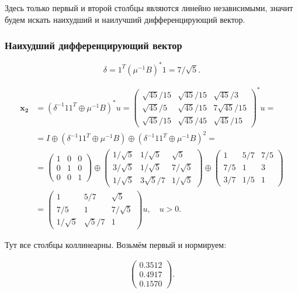 \documentclass[specialist,
  substylefile = spbu.rtx,
  href,
  colorlinks=true,
  12pt]{disser}
\begin{document}
	Здесь только первый и второй столбцы являются линейно независимыми, значит будем искать наихудший и наилучший дифференцирующий вектор.
	
	\subsubsection{Наихудший дифференцирующий вектор}
	\label{sec:org44470ad}
	\[
	\delta = 1^T(\mu^{-1}B)^*1 = 7/\sqrt{5}.
	\]
	
	\begin{align*}
		\boldsymbol{x_2} &= (\delta^{-1}11^T \oplus \mu^{-1}B)^*u = \begin{pmatrix}\sqrt{45}/15 & \sqrt{45}/15 & \sqrt{45}/3\\ \sqrt{45}/5 & \sqrt{45}/15 & 7\sqrt{45}/15 \\ \sqrt{45}/15 & \sqrt{45}/45 & \sqrt{45}/15 \end{pmatrix}^*u = \\
		&= I \oplus (\delta^{-1}11^T \oplus \mu^{-1}B) \oplus (\delta^{-1}11^T \oplus \mu^{-1}B)^2 = \\
		&= \begin{pmatrix} 1&0&0 \\ 0&1&0 \\ 0&0&1 \end{pmatrix}
		\oplus
		\begin{pmatrix}1/\sqrt{5}&1/\sqrt{5}&\sqrt{5}\\3/\sqrt{5}&1/\sqrt{5}&7/\sqrt{5}\\1/\sqrt{5}&3\sqrt{5}/7&1/\sqrt{5}\end{pmatrix}
		\oplus
		\begin{pmatrix}1&5/7&7/5\\7/5&1&3\\3/7&1/5&1\end{pmatrix} \\
		&= \begin{pmatrix} 1&5/7&\sqrt{5}\\ 7/5&1&7/\sqrt{5}\\ 1/\sqrt{5}&\sqrt{5}/7&1 \end{pmatrix}u, \quad u > 0.
	\end{align*}
	
	Тут все столбцы коллинеарны. Возьмём первый и нормируем:
	
	\begin{align*}
		\begin{pmatrix}0.3512\\0.4917\\0.1570\end{pmatrix}.
	\end{align*}
	
\end{document}
